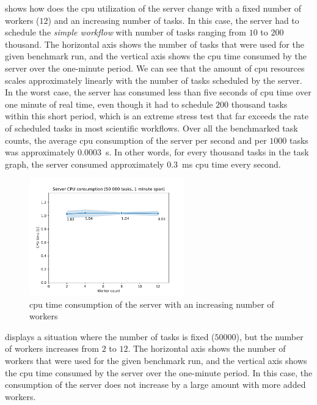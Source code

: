  shows how does the \gls{cpu} utilization of the
server change with a fixed number of workers ($12$) and an increasing number of
tasks. In this case, the server had to schedule the \emph{simple workflow} with number of tasks
ranging from $10$ to $200$ thousand. The horizontal axis shows
the number of tasks that were used for the given benchmark run, and the vertical axis shows the
\gls{cpu} time consumed by the server over the one-minute period. We can see that the
amount of \gls{cpu} resources scales approximately linearly with the number of tasks
scheduled by the server. In the worst case, the server has consumed less than five seconds of
\gls{cpu} time over one minute of real time, even though it had to schedule
$200$ thousand tasks within this short period, which is an extreme stress test
that far exceeds the rate of scheduled tasks in most scientific workflows. Over all the benchmarked
task counts, the average \gls{cpu} consumption of the server per second and per
$1000$ tasks was approximately \SI{0.0003}{\second}. In other words, for every
thousand tasks in the task graph, the server consumed approximately \SI{0.3}{\milli\second}
\gls{cpu} time every second.

\begin{figure}[h]
	\centering
	\includegraphics[width=0.6\textwidth]{imgs/hq/charts/server-utilization-workers}
	\caption{\acrshort{cpu} time consumption of the \hyperqueue{} server with an increasing
	number of workers}
	\label{fig:hq-server-cpu-consumption-workers}
\end{figure}

 displays a situation where the number of tasks
is fixed ($50000$), but the number of workers increases from
$2$ to $12$. The horizontal axis shows the number of workers
that were used for the given benchmark run, and the vertical axis shows the \gls{cpu}
time consumed by the server over the one-minute period. In this case, the consumption of the server
does not increase by a large amount with more added workers.

